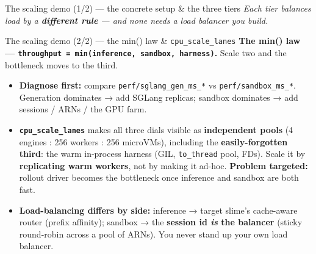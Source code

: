 \documentclass[
  10pt,
  ignorenonframetext,
  aspectratio=169,
  t]{beamer}
\providecommand{\tightlist}{%
  \setlength{\itemsep}{0pt}\setlength{\parskip}{0pt}}
\begin{document}
\begin{frame}{The scaling demo (1/2) --- the concrete setup \&
the three tiers}
\emph{Each tier balances load by a \textbf{different rule} --- and none
needs a load balancer you build.}
\end{frame}

\begin{frame}{The scaling demo (2/2) --- the min() law \&
\texttt{cpu\_scale\_lanes}}
\protect\hypertarget{the-scaling-demo-22-the-min-law-cpu_scale_lanes}{}
\textbf{The min() law ---
\texttt{throughput\ =\ min(inference,\ sandbox,\ harness)}.} Scale two
and the bottleneck moves to the third.

\begin{itemize}
\tightlist
\item
  \textbf{Diagnose first:} compare \texttt{perf/sglang\_gen\_ms\_*} vs
  \texttt{perf/sandbox\_ms\_*}. Generation dominates → add SGLang
  replicas; sandbox dominates → add sessions / ARNs / the GPU farm.
\item
  \textbf{\texttt{cpu\_scale\_lanes}} makes all three dials visible as
  \textbf{independent pools} (4 engines : 256 workers : 256 microVMs),
  including the \textbf{easily-forgotten third}: the warm in-process
  harness (GIL, \texttt{to\_thread} pool, FDs). Scale it by
  \textbf{replicating warm workers}, not by making it ad-hoc.
  \textbf{Problem targeted:} rollout driver becomes the bottleneck once
  inference and sandbox are both fast.
\item
  \textbf{Load-balancing differs by side:} inference → target slime's
  cache-aware router (prefix affinity); sandbox → the \textbf{session id
  \emph{is} the balancer} (sticky round-robin across a pool of ARNs).
  You never stand up your own load balancer.
\end{itemize}
\end{frame}
\end{document}
